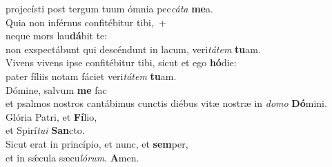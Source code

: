 \evenverse projecísti post tergum tuum ómnia pec\textit{cá}\textit{ta} \textbf{me}a.\\
\oddverse Quia non inférnus confitébitur tibi,~+\\
\oddverse  neque mors lau\textbf{dá}bit te:~\*\\
\oddverse non exspectábunt qui descéndunt in lacum, veri\textit{tá}\textit{tem} \textbf{tu}am.\\
\evenverse Vivens vivens ipse confitébitur tibi, sicut et ego \textbf{hó}die:~\*\\
\evenverse pater fíliis notam fáciet veri\textit{tá}\textit{tem} \textbf{tu}am.\\
\oddverse Dómine, salvum \textbf{me} fac~\*\\
\oddverse et psalmos nostros cantábimus cunctis diébus vitæ nostræ in \textit{do}\textit{mo} \textbf{Dó}mini.\\
\evenverse Glória Patri, et \textbf{Fí}lio,~\*\\
\evenverse et Spirí\textit{tu}\textit{i} \textbf{San}cto.\\
\oddverse Sicut erat in princípio, et nunc, et \textbf{sem}per,~\*\\
\oddverse et in sǽcula sæcu\textit{ló}\textit{rum}. \textbf{A}men.\\
